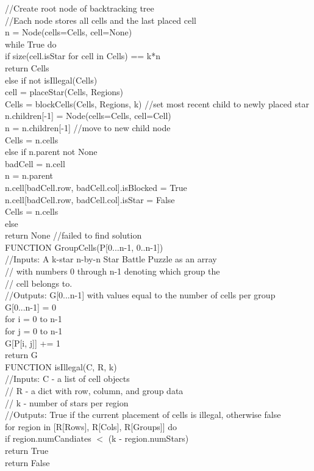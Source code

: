 \documentclass{article}
\newcommand\tab[1][0.5cm]{\hspace*{#1}}
\begin{document}
//Create root node of backtracking tree \\
//Each node stores all cells and the last placed cell \\
n = Node(cells=Cells, cell=None) \\
while True do \\
\tab if size(cell.isStar for cell in Cells) == k*n \\
\tab\tab return Cells \\
\tab else if not isIllegal(Cells) \\
\tab\tab cell = placeStar(Cells, Regions) \\
\tab\tab Cells = blockCells(Cells, Regions, k)
\tab\tab //set most recent child to newly placed star \\
\tab\tab n.children[-1] = Node(cells=Cells, cell=Cell) \\
\tab\tab n = n.children[-1] //move to new child node \\
\tab\tab Cells = n.cells \\
\tab else if n.parent not None \\
\tab\tab badCell = n.cell \\
\tab\tab n = n.parent \\
\tab\tab n.cell[badCell.row, badCell.col].isBlocked = True \\
\tab\tab n.cell[badCell.row, badCell.col].isStar = False \\
\tab\tab Cells = n.cells \\
\tab else \\
\tab\tab return None //failed to find solution \\


FUNCTION GroupCells(P[0...n-1, 0..n-1]) \\
//Inputs: A k-star n-by-n Star Battle Puzzle as an array \\
//  with numbers 0 through n-1 denoting which group the  \\
//  cell belongs to. \\
//Outputs: G[0...n-1] with values equal to the number of cells per group \\
G[0...n-1] = 0 \\
for i = 0 to n-1 \\
\tab for j = 0 to n-1 \\
\tab\tab G[P[i, j]] += 1 \\
return G \\


FUNCTION isIllegal(C, R, k) \\
//Inputs: C - a list of cell objects \\
//  R - a dict with row, column, and group data \\
//  k - number of stars per region \\
//Outputs: True if the current placement of cells is illegal, otherwise false \\
for region in [R[Rows], R[Cols], R[Groups]] do \\
\tab if region.numCandiates $<$ (k - region.numStars) \\
\tab\tab return True \\
return False \\
\end{document}
